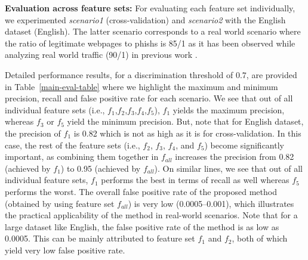\documentclass[10pt,conference,compsocconf,letterpaper]{IEEEtran}
\begin{document}
\iffeateval

\textbf{Evaluation across feature sets:} For evaluating each feature set individually, we experimented \textit{scenario1} (cross-validation) and \textit{scenario2} with the English dataset (English). The latter scenario corresponds to a real world scenario where the ratio of legitimate webpages to phishs is 85/1 as it has been observed while analyzing real world traffic (90/1) in previous work \cite{whittaker:2010:large}.

Detailed performance results, for a discrimination threshold of $0.7$, are provided in Table~\ref{main-eval-table} where we highlight the maximum and minimum precision, recall and false positive rate for each scenario. We see that out of all individual feature sets (i.e., $f_1$,$f_2$,$f_3$,$f_4$,$f_5$), $f_1$ yields the maximum precision, whereas  $f_3$ or  $f_5$ yield the minimum precision. 
But, note that for English dataset, the precision of $f_1$ is 0.82 which is not as high as it is for cross-validation. In this case, the rest of the feature sets (i.e., $f_2$, $f_3$, $f_4$,  and $f_5$) become significantly important, as combining them together in $f_{all}$ increases the precision from 0.82 (achieved by $f_1$) to 0.95 (achieved by $f_{all}$).  
On similar lines, we see that out of all individual feature sets, $f_1$ performs the best in terms of recall as well whereas $f_5$ performs the worst.
The overall false positive rate of the proposed method (obtained by using feature set $f_{all}$) is very low (0.0005--0.001), which illustrates the practical applicability of the method in real-world scenarios. Note that for a large dataset like English, the false positive rate of the method is as low as 0.0005. This can be mainly attributed to feature set $f_1$ and $f_2$, both of which yield very low false positive rate.
\fi  

		
		

\iffeateval
\end{document}
